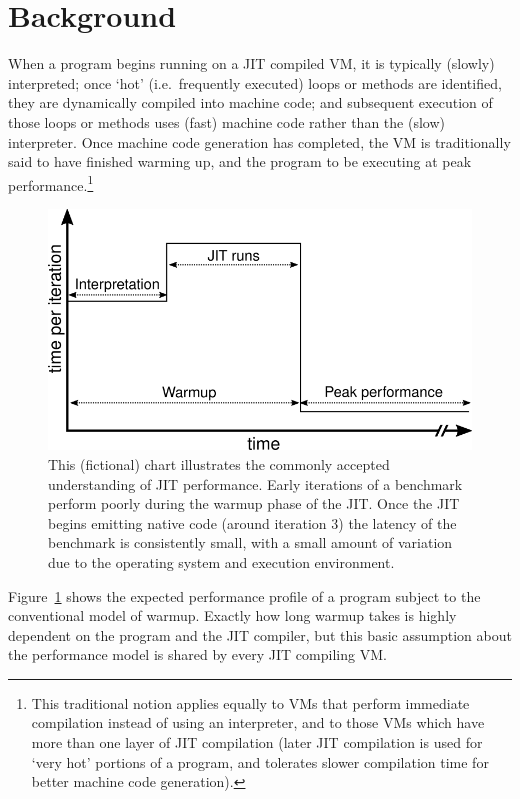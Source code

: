 \documentclass[10pt,preprint]{sigplanconf}
\begin{document}
\section{Background}
\label{sec:warmup}

When a program begins running on a JIT compiled VM, it is typically (slowly)
interpreted; once `hot' (i.e.~frequently executed) loops or methods are
identified, they are dynamically compiled into machine code; and subsequent
execution of those loops or methods uses (fast) machine code rather than the
(slow) interpreter. Once machine code generation has completed, the VM is
traditionally said to have finished warming up, and the program to be executing
at peak performance.\footnote{This traditional notion applies equally to VMs
that perform immediate compilation instead of using an interpreter, and to
those VMs which have more than one layer of JIT compilation (later JIT
compilation is used for `very hot' portions of a program, and tolerates slower
compilation time for better machine code generation).}

\begin{figure}[h!]
\centering
\includegraphics[width=.4\textwidth]{img/picturebook_warmup}
\caption{ This (fictional) chart illustrates the commonly accepted understanding
of JIT performance. Early iterations of a benchmark perform poorly during the
warmup phase of the JIT. Once the JIT begins emitting native code (around
iteration 3) the latency of the benchmark is consistently small, with a small
amount of variation due to the operating system and execution environment.}
\label{fig:trad}
\end{figure}

Figure~\ref{fig:trad} shows the expected performance profile of a
program subject to the conventional model of warmup. Exactly how long warmup
takes is highly dependent on
the program and the JIT compiler, but this basic assumption about the
performance model is shared by every JIT compiling VM.
\end{document}
